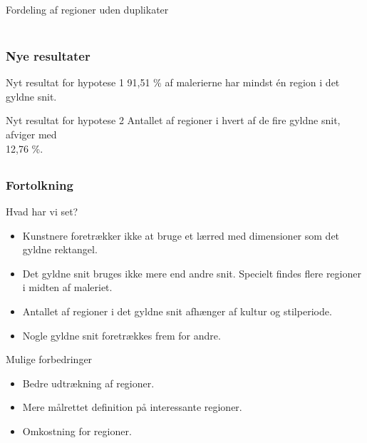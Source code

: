 \documentclass[xcolor=table]{beamer}
\begin{document}
\begin{frame}
\begin{columns}[t]
            Fordeling af regioner uden duplikater
    \end{columns}

\end{frame}

\subsection*{}
\begin{frame}

    \frametitle{Nye resultater}

    \begin{block}{Nyt resultat for hypotese 1\hspace{12em}}
        91,51 \% af malerierne har mindst én region i det gyldne snit.\\
    \end{block}

    \begin{block}{Nyt resultat for hypotese 2\hspace{14em}}
        Antallet af regioner i hvert af de fire gyldne snit, afviger med \\12,76 \%.
    \end{block}

\end{frame}

\subsection*{}
\begin{frame}

    \frametitle{Fortolkning}

    \begin{block}{Hvad har vi set?}
        \begin{itemize}
            \item Kunstnere foretrækker ikke at bruge et lærred med dimensioner som det gyldne rektangel.
            \item Det gyldne snit bruges ikke mere end andre snit. Specielt findes flere regioner i midten af maleriet.
            \item Antallet af regioner i det gyldne snit afhænger af kultur og stilperiode.
            \item Nogle gyldne snit foretrækkes frem for andre.
        \end{itemize}
    \end{block}

    \begin{block}{Mulige forbedringer}
        \begin{itemize}
            \item Bedre udtrækning af regioner.
            \item Mere målrettet definition på interessante regioner.
            \item Omkostning for regioner.
        \end{itemize}
    \end{block}

\end{frame}
\end{document}
